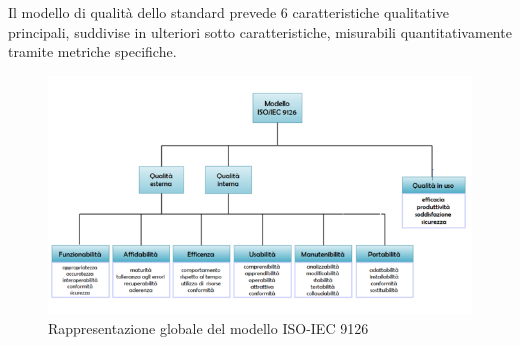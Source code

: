 \noindent Il modello di qualità dello standard prevede 6 caratteristiche qualitative principali, suddivise in ulteriori sotto caratteristiche, misurabili quantitativamente tramite metriche specifiche.

\begin{figure}[h]
\centering
\includegraphics[width=0.7\linewidth]{img/ISO_IEC_9126}
\caption[Rappresentazione globale del modello ISO-IEC 9126]{Rappresentazione globale del modello ISO-IEC 9126}
\label{fig:ISO_IEC_9126}
\end{figure}


